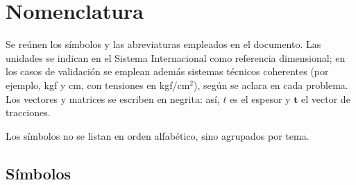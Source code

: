 
\chapter*{Nomenclatura}

Se reúnen los símbolos y las abreviaturas empleados en el documento. Las
unidades se indican en el Sistema Internacional como referencia dimensional;
en los casos de validación se emplean además sistemas técnicos coherentes
(por ejemplo, kgf y cm, con tensiones en kgf/cm$^2$), según se aclara en cada problema.
Los vectores y matrices se escriben en negrita: así, $t$ es el espesor y $\bm{t}$ el
vector de tracciones.

Los símbolos no se listan en orden alfabético, sino agrupados por tema.

\section*{Símbolos}

